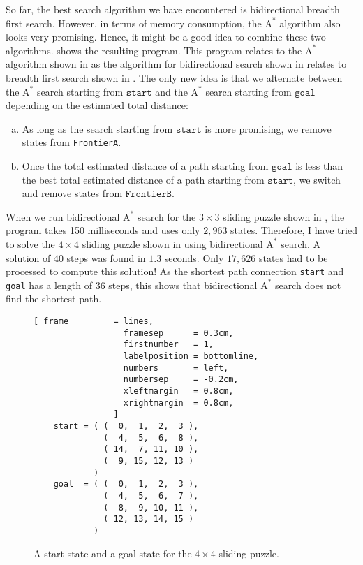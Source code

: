 \noindent
So far, the best search algorithm we have encountered is bidirectional breadth first search.  However, in terms
of memory consumption, the $\mathrm{A}^*$ algorithm also looks very promising.  Hence, it might be a good idea
to combine these two algorithms.   shows the resulting program.  This program
relates to the $\mathrm{A}^*$ algorithm shown in  as the algorithm for bidirectional
search shown in  relates to breadth first search shown in .
The only new idea is that we alternate between the $\mathrm{A}^*$ search starting from $\texttt{start}$ and the
$\mathrm{A}^*$ search starting from $\texttt{goal}$ depending on the estimated total distance:
\begin{enumerate}[(a)]
\item As long as the search starting from $\texttt{start}$ is more promising, we remove states from
      \texttt{FrontierA}.
\item Once the total estimated distance of a path starting from $\texttt{goal}$ is less than the best total
      estimated distance of a path starting from $\texttt{start}$, we switch and remove states from $\texttt{FrontierB}$.
\end{enumerate}
When we run bidirectional $\mathrm{A}^*$ search for the $3 \times 3$ sliding puzzle shown in
, the program takes 150 milliseconds and uses only $2,963$ states.  Therefore, I have tried
to solve the $4 \times 4$ sliding puzzle shown in  using
bidirectional $\mathrm{A}^*$ search.  A solution of $40$ steps was found in $1.3$ seconds.
Only $17,626$ states had to be processed to compute this solution!  As the shortest path connection
\texttt{start} and \texttt{goal} has a length of 36 steps, this shows that bidirectional $\mathrm{A}^*$ search
does not find the shortest path.



\begin{figure}[!ht]
\centering
\begin{Verbatim}[ frame         = lines,
                  framesep      = 0.3cm,
                  firstnumber   = 1,
                  labelposition = bottomline,
                  numbers       = left,
                  numbersep     = -0.2cm,
                  xleftmargin   = 0.8cm,
                  xrightmargin  = 0.8cm,
                ]
    start = ( (  0,  1,  2,  3 ),
              (  4,  5,  6,  8 ),
              ( 14,  7, 11, 10 ),
              (  9, 15, 12, 13 )
            )
    goal  = ( (  0,  1,  2,  3 ),
              (  4,  5,  6,  7 ),
              (  8,  9, 10, 11 ),
              ( 12, 13, 14, 15 )
            )
\end{Verbatim}
\vspace*{-0.3cm}
\caption{A start state and a goal state for the $4 \times 4$ sliding puzzle.}
\label{fig:start-goal.stlx}
\end{figure}


